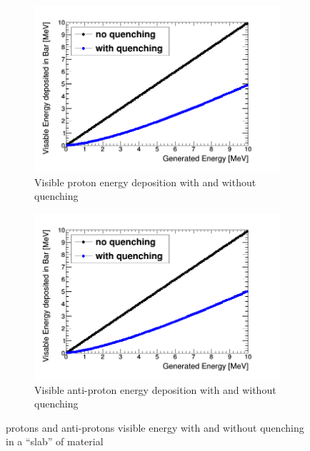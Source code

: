 \begin{figure}[H]
\centering
\begin{subfigure}{.5\textwidth}
  \centering
  \includegraphics[width=\linewidth]{quench_eng_protons.png}
  \captionsetup{width=.9\linewidth}
  \caption{Visible proton energy deposition with and without quenching}
  \label{subFig:proton_quenched_and_not}
\end{subfigure}%
\begin{subfigure}{.5\textwidth}
  \centering
  \includegraphics[width=\linewidth]{quench_eng_Aprotons.png}
  \captionsetup{width=.9\linewidth}
  \caption{Visible anti-proton energy deposition with and without quenching}
  \label{subFig:Aproton_quenched_and_not}
\end{subfigure}
\caption{protons and anti-protons visible energy with and without quenching in a ``slab'' of material}
\label{fig:proton_Apronton_quenched_and_not}
\end{figure}

